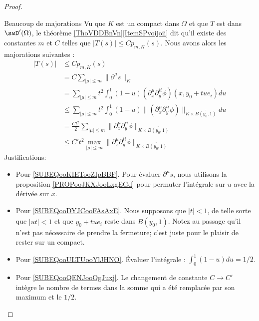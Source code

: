 \begin{proof}
\begin{subproof}
        \item[Beaucoup de majorations]
            Vu que \( K\) est un compact dans \( \Omega\) et que \( T\) est dans \( \swD'(\Omega)\), le théorème \ref{ThoVDDBnVn}\ref{ItemSPvoijoii} dit qu'il existe des constantes \( m\) et \( C\) telles que \( | T(s) |\leq Cp_{m,K}(s)\). Nous avons alors les majorations suivantes :
            \begin{subequations}        \label{SUBEQSooYPLGooOFMSyJ}
                \begin{align}
                | T(s) |&\leq C p_{m,K}(s)\\
                &=C\sum_{| \mu |\leq m}\| \partial^{\mu}s \|_K\\
                &=\sum_{|\mu|\leq m}t^2\int_0^1(1-u)(\partial_x^{\mu}\partial_y^{ii}\phi)(x,y_0+tue_i)du       \label{SUBEQooKIETooZIpBBF}\\
                &\leq\sum_{|\mu|\leq m}t^2\int_0^1(1-u)\| (\partial_x^{\mu}\partial_y^{ii}\phi)\|_{K\times \overline{ B(y_0,1) }} du       \label{SUBEQooDYJCooFAsAxE}    \\
                &=\frac{ Ct^2 }{2}\sum_{| \mu |\leq m}\| \partial_x^{\mu}\partial_y^{ii}\phi \|_{K\times \overline{ B(y_0,1) }}  \label{SUBEQooULTUooYlJHNO} \\
                &\leq C't^2 \max_{| \mu |\leq m}\| \partial_x^{\mu}\partial_y^{ii}\phi \|_{K\times \overline{ B(y_0,1) }}  \label{SUBEQooQENJooOgJuxj}
                \end{align}
            \end{subequations}
            Justifications:
            \begin{itemize}
                \item Pour \eqref{SUBEQooKIETooZIpBBF}. Pour évaluer \( \partial^{\mu}s\), nous utilisons la proposition \ref{PROPooJKXJooLxgEGd} pour permuter l'intégrale sur \( u\) avec la dérivée sur \( x\).
                \item Pour \eqref{SUBEQooDYJCooFAsAxE}. Nous supposons que \( | t |<1\), de telle sorte que \( | ut |<1\) et que \( y_0+tue_i\) reste dans \( \overline{ B(y_0,1) }\). Notez au passage qu'il n'est pas nécessaire de prendre la fermeture; c'est juste pour le plaisir de rester sur un compact.
                \item Pour \eqref{SUBEQooULTUooYlJHNO}. Évaluer l'intégrale : \( \int_0^1(1-u)du=1/2\).
                \item Pour \eqref{SUBEQooQENJooOgJuxj}. Le changement de constante \( C\to C'\) intègre le nombre de termes dans la somme qui a été remplacée par son maximum et le \( 1/2\).

\end{itemize}
\end{subproof}
\end{proof}
